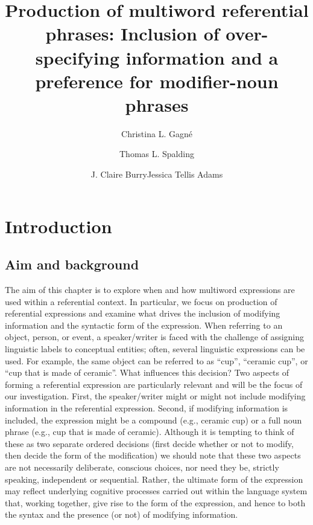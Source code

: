 \documentclass[output=paper]{langsci/langscibook}
\title{Production of multiword referential phrases: Inclusion of
  over-specifying information and a preference for modifier-noun
  phrases}
\author{Christina L. Gagné\affiliation{Department of Psychology, University of Alberta}\and  Thomas L. Spalding\affiliation{Department of Psychology, University of Alberta}\and  J. Claire Burry\affiliation{Department of Psychology, University of Alberta}\lastand  Jessica Tellis Adams\affiliation{KidsAbility Centre for Child Development, Ontario}}
\begin{document}
\maketitle


\section{Introduction}

\subsection{Aim and background}

The aim of this chapter is to explore when and how multiword
expressions are used within a referential context. In particular, we
focus on production of referential expressions and examine what drives
the inclusion of modifying information and the syntactic form of the
expression. When referring to an object, person, or event, a
speaker/writer is faced with the challenge of assigning linguistic
labels to conceptual entities; often, several linguistic expressions
can be used. For example, the same object can be referred to as “cup”,
“ceramic cup”, or “cup that is made of ceramic”. What influences this
decision? Two aspects of forming a referential expression are
particularly relevant and will be the focus of our
investigation. First, the speaker/writer might or might not include
modifying information in the referential expression. Second, if
modifying information is included, the expression might be a compound
(e.g., ceramic cup) or a full noun phrase (e.g., cup that is made of
ceramic). Although it is tempting to think of these as two separate
ordered decisions (first decide whether or not to modify, then decide
the form of the modification) we should note that these two aspects
are not necessarily deliberate, conscious choices, nor need they be,
strictly speaking, independent or sequential. Rather, the ultimate
form of the expression may reflect underlying cognitive processes
carried out within the language system that, working together, give
rise to the form of the expression, and hence to both the syntax and
the presence (or not) of modifying information.
\end{document}
